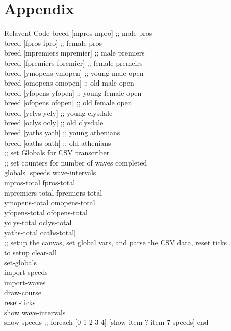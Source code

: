 \documentclass[12pt]{article}
\begin{document}
\section{Appendix}
Relavent Code
breed [mpros mpro]         ;; male pros \\
breed [fpros fpro]         ;; female pros \\
breed [mpremiers mpremier] ;; male premiers \\
breed [fpremiers fpremier] ;; female premeirs \\
breed [ymopens ymopen]     ;; young male open \\
breed [omopens omopen]     ;; old male open \\
breed [yfopens yfopen]     ;; young female open \\
breed [ofopens ofopen]     ;; old female open \\
breed [yclys ycly]         ;; young clysdale \\
breed [oclys ocly]         ;; old clysdale \\
breed [yaths yath]         ;; young athenians \\
breed [oaths oath]         ;; old athenians \\

;; set Globals for CSV transcriber \\
;; set counters for number of waves completed \\
globals [speeds wave-intervals \\
         mpros-total fpros-total \\
         mpremiers-total fpremiers-total \\
         ymopens-total omopens-total \\
         yfopens-total ofopens-total \\
         yclys-total oclys-total \\
         yaths-total oaths-total] \\
;; setup the canvas, set global vars, and parse the CSV data, reset ticks \\
to setup
  clear-all \\
  set-globals \\
  import-speeds \\
  import-waves \\
  draw-course\\
  reset-ticks\\
  show wave-intervals\\
  show speeds
  ;; foreach [0 1 2 3 4] [show item ? item 7 speeds]
end
\end{document}
